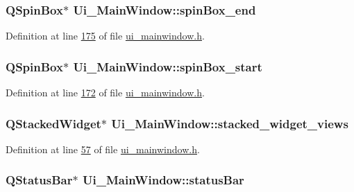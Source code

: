 \hypertarget{a00080_a8ebeb5caa10878d7806d1f548913b449}{
\subsubsection[{spin\+Box\+\_\+end}]{\setlength{\rightskip}{0pt plus 5cm}Q\+Spin\+Box$\ast$ Ui\+\_\+\+Main\+Window\+::spin\+Box\+\_\+end}}\label{a00080_a8ebeb5caa10878d7806d1f548913b449}


Definition at line \hyperlink{a00139_source_l00175}{175} of file \hyperlink{a00139_source}{ui\+\_\+mainwindow.\+h}.

\hypertarget{a00080_acb4d6609c580645dac5aee1f1ad59d01}{
\subsubsection[{spin\+Box\+\_\+start}]{\setlength{\rightskip}{0pt plus 5cm}Q\+Spin\+Box$\ast$ Ui\+\_\+\+Main\+Window\+::spin\+Box\+\_\+start}}\label{a00080_acb4d6609c580645dac5aee1f1ad59d01}


Definition at line \hyperlink{a00139_source_l00172}{172} of file \hyperlink{a00139_source}{ui\+\_\+mainwindow.\+h}.

\hypertarget{a00080_a59e39bd3d716004e840a5be5dda18b96}{
\subsubsection[{stacked\+\_\+widget\+\_\+views}]{\setlength{\rightskip}{0pt plus 5cm}Q\+Stacked\+Widget$\ast$ Ui\+\_\+\+Main\+Window\+::stacked\+\_\+widget\+\_\+views}}\label{a00080_a59e39bd3d716004e840a5be5dda18b96}


Definition at line \hyperlink{a00139_source_l00057}{57} of file \hyperlink{a00139_source}{ui\+\_\+mainwindow.\+h}.

\hypertarget{a00080_a50fa481337604bcc8bf68de18ab16ecd}{
\subsubsection[{status\+Bar}]{\setlength{\rightskip}{0pt plus 5cm}Q\+Status\+Bar$\ast$ Ui\+\_\+\+Main\+Window\+::status\+Bar}}\label{a00080_a50fa481337604bcc8bf68de18ab16ecd}


